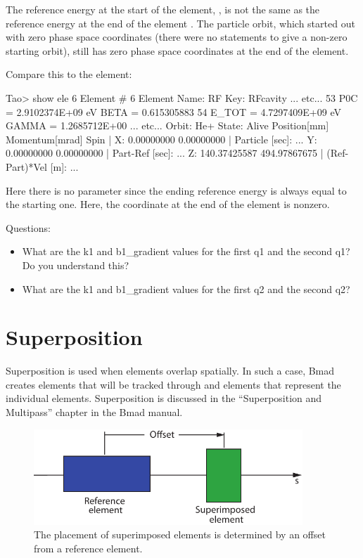 \documentclass{hitec}
\newcommand{\Section}[1]{\section{#1}\vspace*{-1ex}}
\begin{document}
The reference energy at the start of the element, , is not the same as the reference
energy at the end of the element . The particle orbit, which started out with zero phase
space coordinates (there were no  statements to give a non-zero starting orbit), still
has zero phase space coordinates at the end of the  element.


Compare this to the  element:
\begin{code}
Tao> show ele 6
Element #                6
Element Name: RF
Key: RFcavity
... etc...
   53   P0C         =  2.9102374E+09 eV         BETA      =  0.615305883
   54   E_TOT       =  4.7297409E+09 eV         GAMMA     =  1.2685712E+00
... etc...
 Orbit:  He+   State: Alive
         Position[mm] Momentum[mrad]        Spin   |
  X:       0.00000000     0.00000000               | Particle [sec]:     ...
  Y:       0.00000000     0.00000000               | Part-Ref [sec]:     ...
  Z:     140.37425587   494.97867675               | (Ref-Part)*Vel [m]: ...
\end{code}

Here there is no  parameter since the ending reference energy is always equal to the
starting one. Here, the  coordinate at the end of the element is nonzero.

Questions:
\vspace{-10 pt}
\begin{itemize}
\item What are the k1 and b1_gradient values for the first q1 and the second q1? Do you understand this?
\item What are the k1 and b1_gradient values for the first q2 and the second q2?
\end{itemize}

\newpage

\Section{Superposition}
\label{s:super}

Superposition is used when elements overlap spatially. In such a case, Bmad creates 
elements that will be tracked through and  elements that represent the individual elements.
Superposition is discussed in the ``Superposition and Multipass'' chapter in the Bmad manual.

\begin{figure}[b]
  \centering
  \includegraphics[width=0.9\textwidth]{superimpose.pdf}
  \caption{The placement of superimposed elements is determined by an offset from a reference element.}
  \label{f:superimpose}
\end{figure}
\end{document}
